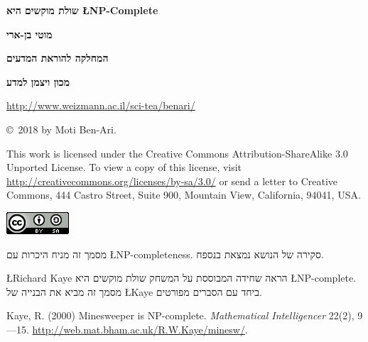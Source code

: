 \documentclass[12pt,a4paper]{article}
\begin{document}
\thispagestyle{empty}


\begin{center}
\textbf{\Huge שולת מוקשים היא
\L{NP-Complete}}

\bigskip
\bigskip

\textbf{\Large מוטי בן-ארי}

\bigskip

\textbf{\Large המחלקה להוראת המדעים}

\bigskip

\textbf{\Large מכון ויצמן למדע}

\bigskip

\url{http://www.weizmann.ac.il/sci-tea/benari/}

\bigskip

\end{center}


\begin{center}
\copyright{}\  2018 by Moti Ben-Ari.
\end{center}

\begin{footnotesize}
This work is licensed under the Creative Commons Attribution-ShareAlike 3.0 Unported License. To view a copy of this license, visit \url{http://creativecommons.org/licenses/by-sa/3.0/} or send a letter to Creative Commons, 444 Castro Street, Suite 900, Mountain View, California, 94041, USA.
\end{footnotesize}

\bigskip

\begin{center}
\includegraphics[width=.2\textwidth]{../by-sa.png}
\end{center}

\bigskip

\newpage


מסמך זה מניח היכרות עם
\L{NP-completeness}.
סקירה של הנושא נמצאת בנספח.

\L{Richard Kaye}
הראה שחידה המבוססת על המשחק שולת מוקשים היא
\L{NP-complete}.
מסמך זה מביא את הבנייה של 
\L{Kaye}
ביחד עם הסברים מפורטים.

Kaye, R. (2000) Minesweeper is NP-complete. \textit{Mathematical Intelligencer} 22(2), 9—15. \url{http://web.mat.bham.ac.uk/R.W.Kaye/minesw/}.
\end{document}
